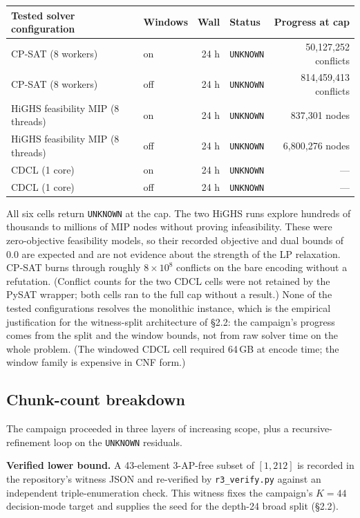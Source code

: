 {\def\LTcaptype{none} %
\begin{longtable}[]{@{}llrlr@{}}
\toprule\noalign{}
Tested solver configuration & Windows & Wall & Status & Progress at cap \\
\midrule\noalign{}
\endhead
\bottomrule\noalign{}
\endlastfoot
CP-SAT (8 workers) & on & 24 h & \texttt{UNKNOWN} & 50,127,252 conflicts \\
CP-SAT (8 workers) & off & 24 h & \texttt{UNKNOWN} & 814,459,413 conflicts \\
HiGHS feasibility MIP (8 threads) & on & 24 h & \texttt{UNKNOWN} & 837,301 nodes \\
HiGHS feasibility MIP (8 threads) & off & 24 h & \texttt{UNKNOWN} & 6,800,276 nodes \\
CDCL (1 core) & on & 24 h & \texttt{UNKNOWN} & --- \\
CDCL (1 core) & off & 24 h & \texttt{UNKNOWN} & --- \\
\end{longtable}
}

All six cells return \texttt{UNKNOWN} at the cap. The two HiGHS runs
explore hundreds of thousands to millions of MIP nodes without proving
infeasibility. These were zero-objective feasibility models, so their
recorded objective and dual bounds of $0.0$ are expected and are not
evidence about the strength of the LP relaxation. CP-SAT burns through roughly
$8 \times 10^8$ conflicts on the bare encoding without a refutation.
(Conflict counts for the two CDCL cells were not retained by the PySAT
wrapper; both cells ran to the full cap without a result.)
None of the tested configurations resolves the monolithic instance, which is the empirical
justification for the witness-split architecture of §2.2: the campaign's
progress comes from the split and the window bounds, not from raw solver
time on the whole problem. (The windowed CDCL cell required 64\,GB at
encode time; the window family is expensive in CNF form.)

\subsection{Chunk-count breakdown}\label{chunk-count-breakdown}

The campaign proceeded in three layers of increasing scope, plus a
recursive-refinement loop on the \texttt{UNKNOWN} residuals.

\textbf{Verified lower bound.} A 43-element 3-AP-free subset of $[1, 212]$ is
recorded in the repository's witness JSON and re-verified by
\texttt{r3\_verify.py} against an independent triple-enumeration check. This
witness fixes the campaign's $K = 44$ decision-mode target and supplies
the seed for the depth-24 broad split (§2.2).

